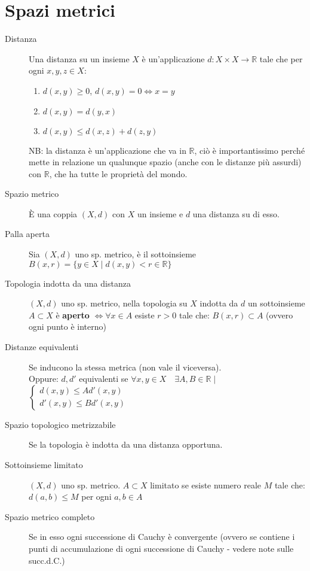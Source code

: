 \documentclass[a4paper,10pt]{article}
\theoremstyle{remark}
\theoremstyle{definition}
\begin{document}
\section*{Spazi metrici}
\begin{description}
    \item[Distanza] Una distanza su un insieme $X$ è un'applicazione $d: X \times X \rightarrow \mathbb{R}$ tale che per ogni $x,y,z \in X$:
    \begin{enumerate}
        \item $d(x,y) \ge 0$,  $d(x,y) = 0 \iff x=y$
        \item $d(x,y) = d(y,x)$
        \item $d(x,y) \le d(x,z)+d(z,y)$
    \end{enumerate}
    NB: la distanza è un'applicazione che va in $\mathbb{R}$, ciò è importantissimo perché mette in relazione un qualunque spazio (anche con le distanze più assurdi) con $\mathbb{R}$, che ha tutte le proprietà del mondo.
    \item[Spazio metrico] È una coppia $(X,d)$ con $X$ un insieme e $d$ una distanza su di esso. 
    \item[Palla aperta] Sia $(X,d)$ uno sp. metrico, è il sottoinsieme $B(x,r) = \{ y \in X \mid d(x,y) <  r \in \mathbb{R}\}$
    \item[Topologia indotta da una distanza] $(X,d)$ uno sp. metrico, nella topologia su $X$ indotta da $d$ un sottoinsieme $A \subset X$ è \textbf{aperto} $\iff \forall x\in A$ esiste $r > 0$ tale che: $B(x,r) \subset A$ (ovvero ogni punto è interno)
    \item[Distanze equivalenti] Se inducono la stessa metrica (non vale il viceversa). \\
    Oppure: $d,d'$ equivalenti se $\forall x,y \in X \quad \exists A,B \in \mathbb{R} \mid$
    $\begin{cases}
       d(x,y) \le Ad'(x,y)  \\
       d'(x,y) \le Bd'(x,y)
    \end{cases}$
    \item[Spazio topologico metrizzabile] Se la topologia è indotta da una distanza opportuna.
    \item[Sottoinsieme limitato] $(X,d)$ uno sp. metrico. $A \subset X$ limitato se esiste numero reale $M$ tale che: $d(a,b) \le M$ per ogni $a,b \in A$
    \item[Spazio metrico completo] Se in esso ogni successione di Cauchy è  convergente (ovvero se contiene i punti di accumulazione di ogni successione di Cauchy - vedere note sulle succ.d.C.)

\end{description}
\end{document}
